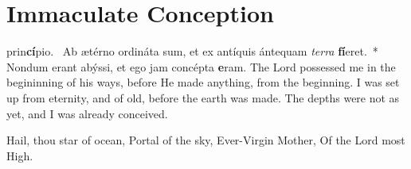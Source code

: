 {

\bigskip
\benedicamusdomino[1]
}



{
\label{immaculateconception}
\def\gabcfolder{../December8-ImmaculateConception}
\section{Immaculate Conception}
\subtitle{1st Class, December 8}

\deusinadjutorium{}

\bigskip
{}
{\def\anttranslation{Thou art all fair, O Mary; and the original stain is not in thee.}
\def\dontrepeatantiphon{T}
}
\bigskip
{}
{\def\anttranslation{Thy vesture is white as snow; and thy face is as the sun.}
}
\bigskip
{}
{\def\anttranslation{Thou art the glory of Jerusalem; thou art the joy of Israel; thou art the honour of our people.}
}
\bigskip
{
\def\anttranslation{Blessed art thou, O Virgin Mary, by the Lord, the Most High God, above all women upon the earth.}
\def\dontrepeatantiphon{T}
\def\noeuouae{T}
}
\bigskip
{
\def\anttranslation{Draw us, O immaculate Virgin: we will run after thee in the odour of thine ointments.}
}
{}
\printchapter
{ prin\-\textbf{cí}\-pi\-o.~\dag{} Ab ætérno ordináta sum, et ex antíquis ántequam \emph{ter\-ra} \textbf{fí}\-e\-ret.~* Nondum erant abýssi, et ego jam concépta \textbf{e}\-ram.}
{The Lord possessed me in the begininning of his ways, before He made anything, from the beginning.  I was set up from eternity, and of old, before the earth was made.  The depths were not as yet, and I was already conceived.}

\bigskip
\label{hymn-avemarisstella}
{
\item Hail, thou star of ocean,
Portal of the sky,
Ever-Virgin Mother,
Of the Lord most High.

}}
